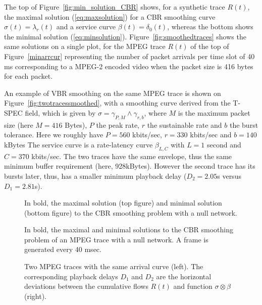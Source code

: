 The top of Figure~\ref{fig:min_solution_CBR} shows, for a synthetic trace $R(t)$,
 the maximal solution (\ref{eq:maxsolution}) for a CBR smoothing curve
$\sigma(t) = \lambda_r(t)$ and a service curve $\beta(t) = \delta_0(t)$,
whereas the bottom shows %
the minimal solution (\ref{eq:minsolution}). Figure~\ref{fig:smoothedtraces} shows the same solutions on a single
plot, for the MPEG trace $R(t)$ of the top of Figure~\ref{minarrcur} representing the number of packet arrivals per time slot of 40 ms corresponding to a MPEG-2 encoded video when the packet size is 416 bytes for each packet.

An example of VBR smoothing on the same MPEG trace is shown on Figure~\ref{fig:twotracessmoothed}, with a smoothing curve derived from the T-SPEC field, which is
given by $\sigma = \gamma_{P,M} \wedge \gamma_{r,b}$, where $M$ is the maximum packet size (here $M= 416$ Bytes),
$P$ the peak rate, $r$ the sustainable rate and $b$ the burst tolerance. Here we roughly have
$P = 560$ kbits/sec, $r = 330$ kbits/sec and $b = 140$ kBytes
The service curve is a rate-latency curve $\beta_{L,C}$ with $L = 1$ second and $C = 370$ kbits/sec.
The two traces have the same envelope, thus the same minimum buffer requirement (here, 928kBytes).
However the second trace has its bursts later, thus, has a smaller
   minimum playback delay ($D_2=2.05$s versus $D_1=2.81$s).


\begin{figure}[h!]
\caption{In bold, the maximal solution (top figure) and minimal solution (bottom figure)
to the CBR  smoothing problem with a null network.}
\end{figure}

\begin{figure}[h!]
\caption{In bold, the maximal and minimal solutions
to the CBR  smoothing problem of an MPEG trace with a null network. A frame is generated every 40 msec.}
\end{figure}

\begin{figure}[h!]
\caption{Two MPEG traces with the same arrival curve (left). The corresponding playback delays $D_1$ and $D_2$ are the horizontal deviations between the cumulative flows $R(t)$ and function $\sigma \otimes \beta$ (right).}
\end{figure}

